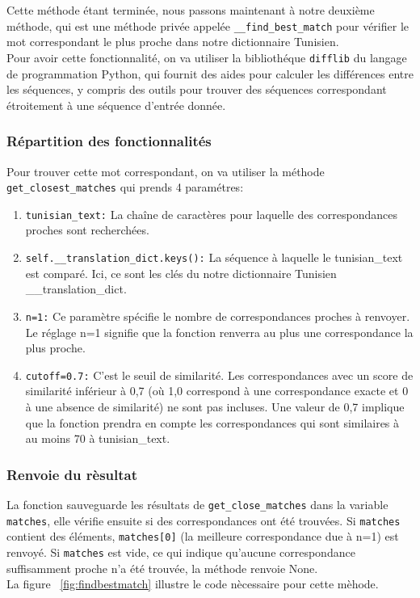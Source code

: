 \noindent
Cette méthode étant terminée, nous passons maintenant à notre deuxième méthode, qui est une méthode privée appelée \texttt{\_\_find\_best\_match} pour vérifier le mot correspondant le plus proche dans notre dictionnaire Tunisien. \\
Pour avoir cette fonctionnalité, on va utiliser la bibliothéque \texttt{difflib} du langage de programmation Python, qui fournit des aides pour calculer les différences entre les séquences, y compris des outils pour trouver des séquences correspondant étroitement à une séquence d'entrée donnée.

\subsubsection{Répartition des fonctionnalités}
\noindent
Pour trouver cette mot correspondant, on va utiliser la méthode \\
\texttt{get\_closest\_matches} qui prends 4 paramétres:
\begin{enumerate}
	\item \texttt{tunisian\_text:} La chaîne de caractères pour laquelle des correspondances proches sont recherchées.
	\item \texttt{self.\_\_translation\_dict.keys():} La séquence à laquelle le tunisian\_text est comparé. Ici, ce sont les clés du notre dictionnaire Tunisien \_\_translation\_dict.
	\item \texttt{n=1:} Ce paramètre spécifie le nombre de correspondances proches à renvoyer. Le réglage n=1 signifie que la fonction renverra au plus une correspondance la plus proche.
	\item \texttt{cutoff=0.7:} C'est le seuil de similarité. Les correspondances avec un score de similarité inférieur à 0,7 (où 1,0 correspond à une correspondance exacte et 0 à une absence de similarité) ne sont pas incluses. Une valeur de 0,7 implique que la fonction prendra en compte les correspondances qui sont similaires à au moins 70 à tunisian\_text.
\end{enumerate}

\subsubsection{Renvoie du rèsultat}
\noindent
La fonction sauveguarde les résultats de \texttt{get\_close\_matches} dans la variable \texttt{matches}, elle vérifie ensuite si des correspondances ont été trouvées. Si \texttt{matches} contient des éléments, \texttt{matches[0]} (la meilleure correspondance due à n=1) est renvoyé. Si \texttt{matches} est vide, ce qui indique qu'aucune correspondance suffisamment proche n'a été trouvée, la méthode renvoie None.\\ La figure ~\ref{fig:findbestmatch} illustre le code nècessaire pour cette mèhode.

